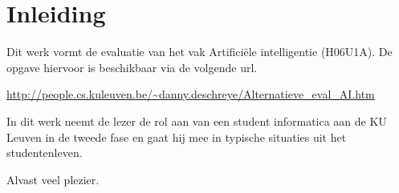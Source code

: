 \documentclass[alternative-exam.tex]{subfiles}
\begin{document}
\chapter*{Inleiding}
Dit werk vormt de evaluatie van het vak Artifici\"ele intelligentie (H06U1A). De opgave hiervoor is beschikbaar via de volgende url.
\begin{center}
\url{http://people.cs.kuleuven.be/~danny.deschreye/Alternatieve_eval_AI.htm}
\end{center}
In dit werk neemt de lezer de rol aan van een student informatica aan de KU Leuven in de tweede fase en gaat hij mee in typische situaties uit het studentenleven.

\vspace{1cm}
\noindent Alvast veel plezier.
\end{document}
